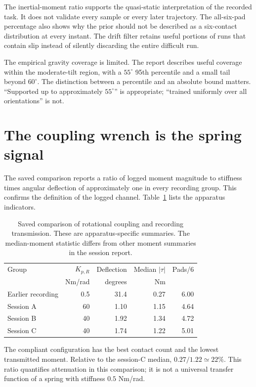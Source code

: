 The inertial-moment ratio supports the quasi-static interpretation of the recorded task. It does not validate every sample or every later trajectory. The all-six-pad percentage also shows why the prior should not be described as a six-contact distribution at every instant. The drift filter retains useful portions of runs that contain slip instead of silently discarding the entire difficult run.

The empirical gravity coverage is limited. The report describes useful coverage within the moderate-tilt region, with a $55^\circ$ 95th percentile and a small tail beyond $60^\circ$. The distinction between a percentile and an absolute bound matters. ``Supported up to approximately $55^\circ$'' is appropriate; ``trained uniformly over all orientations'' is not.

\section{The coupling wrench is the spring signal}

The saved comparison reports a ratio of logged moment magnitude to stiffness times angular deflection of approximately one in every recording group. This confirms the definition of the logged channel. Table~\ref{tab:coupling-groups} lists the apparatus indicators.

\begin{table}[htbp]\centering\small
\begin{tabular}{@{}lrrrr@{}}\toprule
Group & $K_{p,R}$ & Deflection & Median $|\tau|$ & Pads/6\\
& Nm/rad & degrees & Nm & \\\midrule
Earlier recording & 0.5 & 31.4 & 0.27 & 6.00\\
Session A & 60 & 1.10 & 1.15 & 4.64\\
Session B & 40 & 1.92 & 1.34 & 4.72\\
Session C & 40 & 1.74 & 1.22 & 5.01\\
\bottomrule\end{tabular}
\caption{Saved comparison of rotational coupling and recording transmission. These are apparatus-specific summaries. The median-moment statistic differs from other moment summaries in the session report.}
\label{tab:coupling-groups}
\end{table}

The compliant configuration has the best contact count and the lowest transmitted moment. Relative to the session-C median, $0.27/1.22\simeq22\%$. This ratio quantifies attenuation in this comparison; it is not a universal transfer function of a spring with stiffness $0.5$ Nm/rad.

